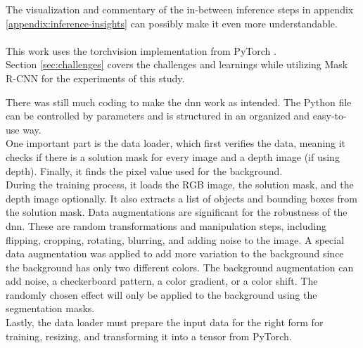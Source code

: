 		The visualization and commentary of the in-between inference steps in appendix \ref{appendix:inference-insights} can possibly make it even more understandable.\\
		\\
		This work uses the torchvision implementation from PyTorch \cite{Torchvision}.\\
		Section \ref{sec:challenges} covers the challenges and learnings while utilizing Mask R-CNN for the experiments of this study.
		
		\clearpage
		There was still much coding to make the \ac{dnn} work as intended. The Python file can be controlled by parameters and is structured in an organized and easy-to-use way.\\
		One important part is the data loader, which first verifies the data, meaning it checks if there is a solution mask for every image and a depth image (if using depth). Finally, it finds the pixel value used for the background.\\
		During the training process, it loads the RGB image, the solution mask, and the depth image optionally. It also extracts a list of objects and bounding boxes from the solution mask. Data augmentations are significant for the robustness of the \ac{dnn}. These are random transformations and manipulation steps, including flipping, cropping, rotating, blurring, and adding noise to the image. A special data augmentation was applied to add more variation to the background since the background has only two different colors. The background augmentation can add noise, a checkerboard pattern, a color gradient, or a color shift. The randomly chosen effect will only be applied to the background using the segmentation masks. \\ %
		Lastly, the data loader must prepare the input data for the right form for training, resizing, and transforming it into a tensor from PyTorch.\\
		\iffalse
